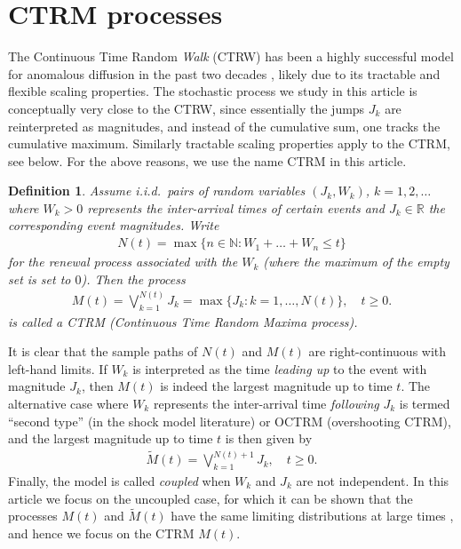 \documentclass[12pt]{article}
\newtheorem{definition}[theorem]{Definition}
\theoremstyle{definition}
\theoremstyle{remark}
\numberwithin{equation}{section}
\newcommand{\R}{\mathbb R}
\newcommand{\1}{\mathbf 1}
\begin{document}
\section{CTRM processes}

The Continuous Time Random \emph{Walk} (CTRW) has been a highly successful 
model for anomalous diffusion in the past two decades 
\cite{Metzler2000,HLS2010b}, likely due to its tractable and flexible scaling
properties.
The stochastic process we study in this article is conceptually very close
to the CTRW, since essentially the jumps $J_k$ are reinterpreted as 
magnitudes, and instead of the cumulative sum, one tracks the cumulative 
maximum. Similarly tractable scaling properties apply to the CTRM, see below.
For the above reasons, we use the name CTRM in this article.


\begin{definition}
Assume i.i.d.\ pairs of random variables $(J_k, W_k)$, $k = 1, 2, \ldots$
where $W_k > 0$ represents the inter-arrival times of certain events and 
$J_k \in \R$ the corresponding event magnitudes.  
Write 
\begin{align} \label{eq:renewal-process}
N(t) = \max\{n \in \mathbb N: W_1 + \ldots + W_n \le t\}
\end{align}
for the renewal process
associated with the $W_k$ (where the maximum of the empty set is set to $0$).
Then the process
\begin{align}
M(t) = \bigvee_{k=1}^{N(t)} J_k
= \max\{J_k: k = 1, \ldots, N(t)\}, \quad t \ge 0.
\end{align}
is called a CTRM (Continuous Time Random Maxima process).
\end{definition}

 

It is clear that the sample paths of $N(t)$ and $M(t)$ are right-continuous
with left-hand limits. 
If $W_k$ is interpreted as the time \emph{leading up} to the event with magnitude
$J_k$, then $M(t)$ is indeed the largest magnitude up to time $t$.
The alternative case where $W_k$ represents the inter-arrival time 
\textit{following} $J_k$ 
is termed ``second type'' (in the shock model literature) or OCTRM
(overshooting CTRM), and the largest magnitude up to time $t$ is then
given by
\begin{align}
\tilde M(t) = \bigvee_{k=1}^{N(t)+1} J_k, \quad t \ge 0.
\end{align}
Finally, the model is called \emph{coupled} when $W_k$ and $J_k$ are not independent.
In this article we focus on the uncoupled case,  
for which it can be shown that the processes $M(t)$ and
$\tilde M(t)$ have the same limiting distributions at large times
\cite{Hees2015}, and hence we focus on the CTRM $M(t)$. 
\end{document}

